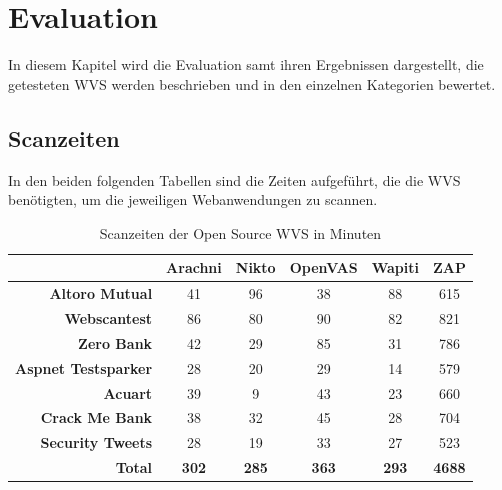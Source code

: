 \documentclass[12pt,oneside,a4paper,parskip,pointlessnumbers]{scrbook}
\begin{document}
\chapter{Evaluation}
In diesem Kapitel wird die Evaluation samt ihren Ergebnissen dargestellt, die getesteten WVS werden beschrieben und in den einzelnen Kategorien bewertet.
\section{Scanzeiten}
In den beiden folgenden Tabellen sind die Zeiten aufgeführt, die die WVS benötigten, um die jeweiligen Webanwendungen zu scannen.
\begin{table}[H]
\begin{tabular}{|r|c|c|c|c|c|}
\hline
                       & \textbf{Arachni} & \textbf{Nikto} & \textbf{OpenVAS} & \textbf{Wapiti} & \textbf{ZAP}  \\
\hline
\textbf{Altoro Mutual}      & 41               & 96             & 38               & 88              & 615                        \\
\hline
\textbf{Webscantest}        & 86               & 80             & 90               & 82              & 821                        \\
\hline
\textbf{Zero Bank}          & 42               & 29             & 85               & 31              & 786                        \\
\hline
\textbf{Aspnet Testsparker} & 28               & 20             & 29               & 14              & 579                        \\
\hline
\textbf{Acuart}             & 39               & 9              & 43               & 23              & 660                        \\
\hline
\textbf{Crack Me Bank}      & 38               & 32             & 45               & 28              & 704                        \\
\hline
\textbf{Security Tweets}    & 28               & 19             & 33               & 27              & 523                        \\
\hline
\textbf{Total}              & \textbf{302}     & \textbf{285}   & \textbf{363}     & \textbf{293}    & \textbf{4688}              \\
\hline
\end{tabular}
\caption[Scanzeiten der Open Source WVS in Minuten]{Scanzeiten der Open Source WVS in Minuten}
\end{table}
\end{document}
